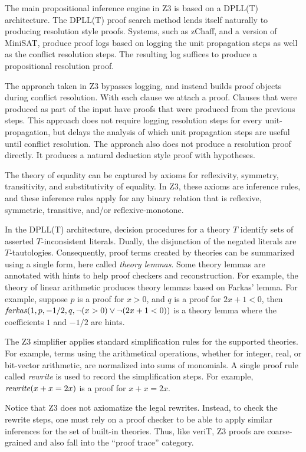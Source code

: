\documentclass{llncs}
\begin{document}
The main propositional inference engine in Z3 is based on a DPLL(T) architecture.
The DPLL(T) proof search method lends itself naturally to producing resolution style proofs.
Systems, such as zChaff, and a version of MiniSAT, produce proof logs based on logging the
unit propagation steps as well as the conflict resolution steps. The resulting log suffices to produce a
propositional resolution proof.

The approach taken in Z3 bypasses logging, and instead builds proof
objects during conflict resolution.  With each clause we attach a
proof. Clauses that were produced as part of the input have proofs
that were produced from the previous steps. This approach does not
require logging resolution steps for every unit-propagation, but
delays the analysis of which unit propagation steps are useful until
conflict resolution. The approach also does not produce a resolution
proof directly. It produces a natural deduction style proof with
hypotheses.

The theory of equality can be captured by axioms for reflexivity,
symmetry, transitivity, and substitutivity of equality. In Z3,
these axioms are inference rules, and these inference rules apply
for any binary relation that is reflexive,
symmetric, transitive, and/or reflexive-monotone.

In the DPLL(T) architecture, decision procedures for a theory $T$
identify sets of asserted $T$-inconsistent literals. Dually, the
disjunction of the negated literals are $T$-tautologies. Consequently,
proof terms created by theories can be summarized using a single form,
here called \emph{theory lemmas}. Some theory lemmas are annotated
with hints to help proof checkers and reconstruction. For example, the
theory of linear arithmetic produces theory lemmas based on Farkas'
lemma. For example, suppose $p$ is a proof for $x > 0$, and $q$ is a
proof for $2x + 1 < 0$, then $\mbox{\emph{farkas}}(1, p, -1/2, q, \neg(x > 0) \vee \neg(2x + 1 < 0))$
is a theory lemma where the coefficients $1$ and $-1/2$ are hints.



The Z3 simplifier applies standard simplification rules for the
supported theories. For example, terms using the arithmetical operations,
whether for integer, real, or bit-vector arithmetic, are normalized into sums of monomials.
A single proof rule called \emph{rewrite} is used to record the simplification steps.
For example, $\mbox{\emph{rewrite}}(x + x = 2 x)$ is a proof for $x + x = 2x$.

Notice that Z3 does not axiomatize the legal rewrites.
Instead, to check the rewrite steps, one must rely on a
proof checker to be able to apply similar inferences for the set of built-in theories.
Thus, like veriT, Z3 proofs are coarse-grained and also fall into the ``proof trace''
category.
\end{document}
